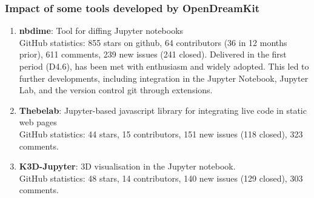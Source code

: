 \subsubsection{Impact of some tools developed by OpenDreamKit}



\begin{enumerate}
\item \textbf{nbdime}: Tool for diffing Jupyter notebooks\\
  GitHub statistics: 855 stars on github, 64 contributors (36 in 12
  months prior), 611 comments, 239 new issues (241 closed). Delivered
  in the first period (D4.6),  has been met with
  enthusiasm and widely adopted. This led to further developments,
  including integration in the Jupyter Notebook,
  Jupyter Lab, and the version control git through extensions.
\item \textbf{Thebelab}: Jupyter-based javascript library for integrating live code in static web pages\\
  GitHub statistics: 44 stars, 15 contributors, 151 new issues (118 closed), 323 comments.\\
\item \textbf{K3D-Jupyter}: 3D visualisation in the Jupyter notebook.\\
  GitHub statistics: 48 stars, 14 contributors, 140 new issues (129 closed), 303 comments.
\end{enumerate}


